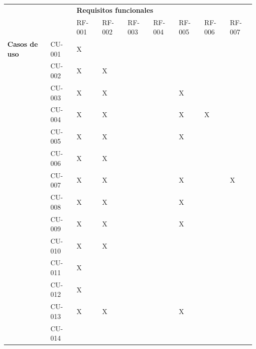 \begin{table}[htpb]
\centering
\begin{tabularx}{\textwidth}{|l|X|X|X|X|X|X|X|X|}
\hline
\multicolumn{2}{|l|}{\multirow{2}{*}{}} & \multicolumn{7}{l|}{\textbf{Requisitos funcionales}}                  \\ \cline{3-9} 
\multicolumn{2}{|l|}{}                  & RF-001 & RF-002 & RF-003 & RF-004 & RF-005 & RF-006 & RF-007 \\ \hline
\textbf{Casos de uso}             & CU-001       & X      &        &        &        &        &        &        \\ \hline
\multirow{15}{*}{}       & CU-002       & X      & X      &        &        &        &        &        \\ \cline{2-9} 
                         & CU-003       & X      & X      &        &        & X      &        &        \\ \cline{2-9} 
                         & CU-004       & X      & X      &        &        & X      & X      &        \\ \cline{2-9} 
                         & CU-005       & X      & X      &        &        & X      &        &        \\ \cline{2-9} 
                         & CU-006       & X      & X      &        &        &        &        &        \\ \cline{2-9} 
                         & CU-007       & X      & X      &        &        & X      &        & X      \\ \cline{2-9} 
                         & CU-008       & X      & X      &        &        & X      &        &        \\ \cline{2-9} 
                         & CU-009       & X      & X      &        &        & X      &        &        \\ \cline{2-9} 
                         & CU-010       & X      & X      &        &        &        &        &        \\ \cline{2-9} 
                         & CU-011       & X      &        &        &        &        &        &        \\ \cline{2-9} 
                         & CU-012       & X      &        &        &        &        &        &        \\ \cline{2-9} 
                         & CU-013       & X      & X      &        &        & X      &        &        \\ \cline{2-9} 
                         & CU-014       &        &        &        &        &        &        &        \\ \cline{2-9} 

\end{tabularx}
\end{table}
